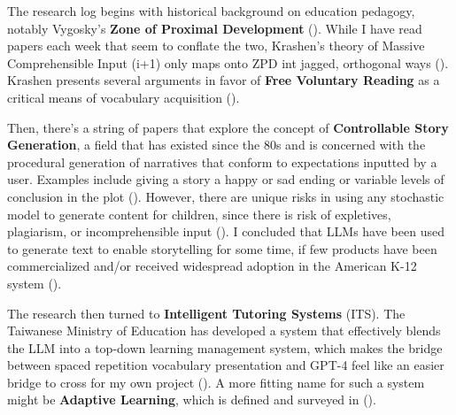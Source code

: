 \documentclass[
	letterpaper, %
]{jdf}
\newcommand{\pcite}[1]{(\cite{#1})}
\begin{document}
The research log begins with historical background on education pedagogy, notably Vygosky's \textbf{Zone of Proximal Development} \pcite{vygotsky}. While I have read papers each week that seem to conflate the two, Krashen's theory of Massive Comprehensible Input (i+1) only maps onto ZPD int jagged, orthogonal ways \pcite{vygostky_krashen_not_same}. Krashen presents several arguments in favor of \textbf{Free Voluntary Reading} as a critical means of vocabulary acquisition \pcite{free_voluntary_reading}.

Then, there's a string of papers that explore the concept of \textbf{Controllable Story Generation}, a field that has existed since the 80s and is concerned with the procedural generation of narratives that conform to expectations inputted by a user. Examples include giving a story a happy or sad ending or variable levels of conclusion in the plot \pcite{controllable_story_generation}. However, there are unique risks in using any stochastic model to generate content for children, since there is risk of expletives, plagiarism, or incomprehensible input \pcite{recent_story_generation_review, ai_human_taking_turns_creating_story}. I concluded that LLMs have been used to generate text to enable storytelling for some time, if few products have been commercialized and/or received widespread adoption in the American K-12 system \pcite{ye2023storypark}.

The research then turned to \textbf{Intelligent Tutoring Systems} (ITS). The Taiwanese Ministry of Education has developed a system that effectively blends the LLM into a top-down learning management system, which makes the bridge between spaced repetition vocabulary presentation and GPT-4 feel like an easier bridge to cross for my own project \pcite{taiwan_adaptive_testing}. A more fitting name for such a system might be \textbf{Adaptive Learning}, which is defined and surveyed in \pcite{important_adaptive_learning_exercise_generation}.
\end{document}
